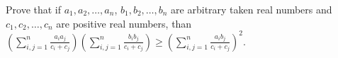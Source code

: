 Prove that if $ a_{1},a_{2},\ldots,a_{n}$, $ b_{1},b_{2},\ldots,b_{n}$ are arbitrary taken real numbers and $ c_{1},c_{2},\ldots,c_{n}$
are positive real numbers, than
$ \left(\sum_{i,j = 1}^{n}\frac {a_{i}a_{j}}{c_{i} + c_{j}}\right)\left(\sum_{i,j = 1}^{n}\frac {b_{i}b_{j}}{c_{i} + c_{j}}\right)\ge \left(\sum_{i,j = 1}^{n}\frac {a_{i}b_{j}}{c_{i} + c_{j}}\right)^{2}$.